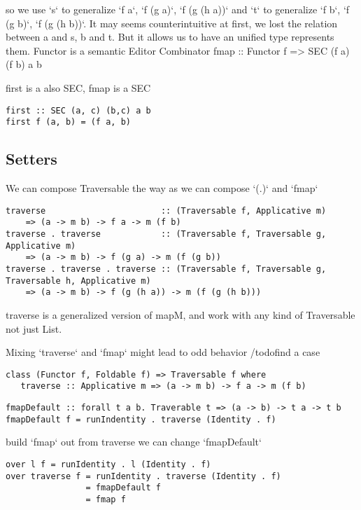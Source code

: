 so we use `s` to generalize `f a`,  `f (g a)`, `f (g (h a))` and `t` to generalize `f b`,  `f (g b)`, `f (g (h b))`.
It may seems counterintuitive at first, we lost the relation between a and s, b and t. But it allows us to have an unified type represents them.
Functor is a semantic Editor Combinator
fmap :: Functor f => SEC (f a) (f b) a b

first is a also SEC, fmap is a SEC

\begin{verbatim}
first :: SEC (a, c) (b,c) a b
first f (a, b) = (f a, b)
\end{verbatim}


\subsection{Setters}
We can compose Traversable the way as we can compose `(.)` and `fmap`

\begin{verbatim}
traverse                       :: (Traversable f, Applicative m)
    => (a -> m b) -> f a -> m (f b)
traverse . traverse            :: (Traversable f, Traversable g, Applicative m)
    => (a -> m b) -> f (g a) -> m (f (g b))
traverse . traverse . traverse :: (Traversable f, Traversable g, Traversable h, Applicative m)
    => (a -> m b) -> f (g (h a)) -> m (f (g (h b)))
\end{verbatim}

traverse is a generalized version of mapM, and work with any kind of Traversable not just List.

Mixing `traverse` and `fmap` might lead to odd behavior /todo{find a case}

\begin{verbatim}
class (Functor f, Foldable f) => Traversable f where
   traverse :: Applicative m => (a -> m b) -> f a -> m (f b)
\end{verbatim}

\begin{verbatim}
fmapDefault :: forall t a b. Traverable t => (a -> b) -> t a -> t b
fmapDefault f = runIndentity . traverse (Identity . f)
\end{verbatim}

build `fmap` out from traverse
we can change `fmapDefault`

\begin{verbatim}
over l f = runIdentity . l (Identity . f)
over traverse f = runIdentity . traverse (Identity . f)
                = fmapDefault f
                = fmap f
\end{verbatim}


